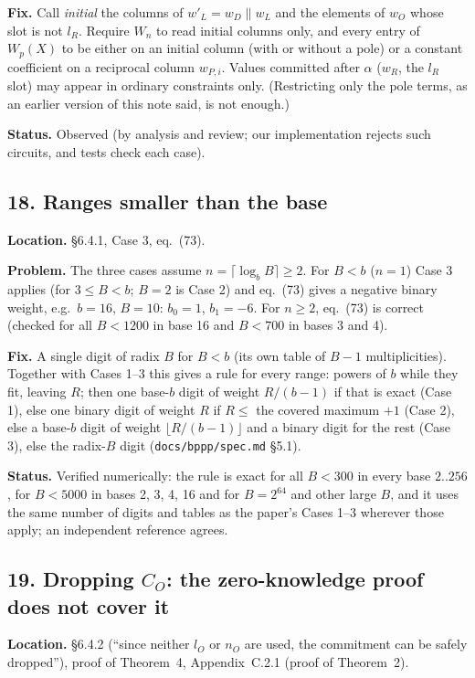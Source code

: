 \documentclass[11pt,a4paper]{article}
\newcommand{\status}[1]{\par\noindent\textbf{Status.} #1}
\newcommand{\loc}[1]{\par\noindent\textbf{Location.} #1}
\begin{document}
\noindent\textbf{Fix.} Call \emph{initial} the columns of $w'_L = w_D \| w_L$ and the elements of
$w_O$ whose slot is not $l_R$. Require $W_n$ to read initial columns only, and every entry of
$W_p(X)$ to be either on an initial column (with or without a pole) or a constant coefficient on a
reciprocal column $w_{P,i}$. Values committed after $\alpha$ ($w_R$, the $l_R$ slot) may appear in
ordinary constraints only. (Restricting only the pole terms, as an earlier version of this note
said, is not enough.)
\status{Observed (by analysis and review; our implementation rejects such circuits, and tests
check each case).}

\subsection*{18. Ranges smaller than the base}
\loc{\S6.4.1, Case 3, eq.~(73).}

\noindent\textbf{Problem.} The three cases assume $n = \lceil \log_b B \rceil \ge 2$. For $B < b$ ($n = 1$)
Case 3 applies (for $3 \le B < b$; $B = 2$ is Case 2) and eq.~(73) gives a negative binary weight,
e.g.\ $b = 16$, $B = 10$: $b_0 = 1$, $b_1 = -6$. For $n \ge 2$, eq.~(73) is correct (checked for
all $B < 1200$ in base 16 and $B < 700$ in bases 3 and 4).

\noindent\textbf{Fix.} A single digit of radix $B$ for $B < b$ (its own table of $B - 1$
multiplicities). Together with Cases 1--3 this gives a rule for every range: powers of $b$ while
they fit, leaving $R$; then one base-$b$ digit of weight $R/(b-1)$ if that is exact (Case 1), else
one binary digit of weight $R$ if $R \le$ the covered maximum $+1$ (Case 2), else a base-$b$
digit of weight $\lfloor R/(b-1)\rfloor$ and a binary digit for the rest (Case 3), else the radix-$B$
digit (\texttt{docs/bppp/spec.md} \S5.1).
\status{Verified numerically: the rule is exact for all $B < 300$ in every base $2..256$, for
$B < 5000$ in bases 2, 3, 4, 16 and for $B = 2^{64}$ and other large $B$, and it uses the same
number of digits and tables as the paper's Cases 1--3 wherever those apply; an independent
reference agrees.}

\subsection*{19. Dropping $C_O$: the zero-knowledge proof does not cover it}
\loc{\S6.4.2 (``since neither $l_O$ or $n_O$ are used, the commitment can be safely dropped''),
proof of Theorem~4, Appendix~C.2.1 (proof of Theorem~2).}
\end{document}
